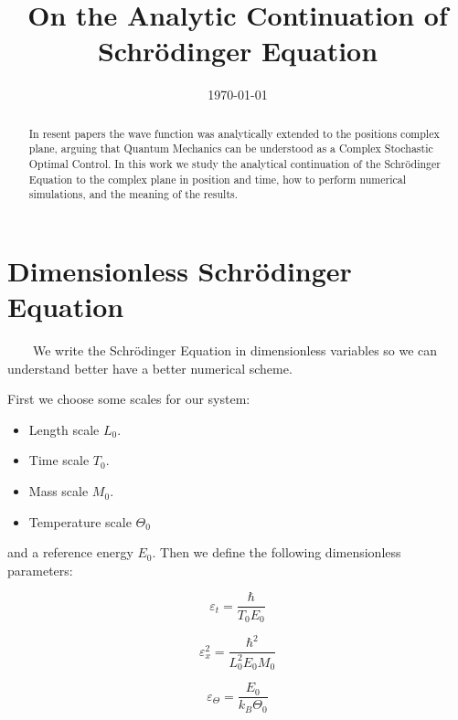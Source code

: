 \documentclass[a4paper,12pt]{article}
\begin{document}
\title{On the Analytic Continuation of Schr\"odinger Equation}
\date{\today}
\maketitle

\begin{abstract}
	In resent papers \cite{yordanov2024complex} \cite{yang2021extending} the wave function
	was analytically extended to the positions complex plane, arguing that Quantum Mechanics can be understood as a
	Complex Stochastic Optimal Control. In this work we study the analytical continuation of the Schr\"odinger Equation to the 
	complex plane in position and time, how to perform numerical simulations, and the meaning of the results.
\end{abstract}


\section{Dimensionless Schr\"odinger Equation}

~~~~We write the Schr\"odinger Equation in dimensionless variables so we can understand better have a better numerical scheme.

First we choose some scales for our system:

\begin{itemize}
\item Length scale $L_0$.
\item Time scale $T_0$.
\item Mass scale $M_0$.
\item Temperature scale $\Theta_0$
\end{itemize}

and a reference energy $E_0$. Then we define the following dimensionless parameters:

\begin{equation}\label{eps_t}
\varepsilon_t = \frac{\hbar}{T_0 E_0 }
\end{equation}

\begin{equation}\label{eps_x}
\varepsilon_x^2 = \frac{\hbar^2}{L_0^2 E_0 M_0}
\end{equation}

\begin{equation}\label{eps_theta}
\varepsilon_{\Theta} = \frac{E_0}{k_B \Theta_0}
\end{equation}
\end{document}
